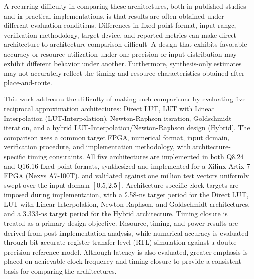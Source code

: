 \documentclass[manuscript,screen,review]{acmart}
\begin{document}
A recurring difficulty in comparing these architectures, both in published studies and in practical implementations, is that results are often obtained under different evaluation conditions. Differences in fixed-point format, input range, verification methodology, target device, and reported metrics can make direct architecture-to-architecture comparison difficult. A design that exhibits favorable accuracy or resource utilization under one precision or input distribution may exhibit different behavior under another. Furthermore, synthesis-only estimates may not accurately reflect the timing and resource characteristics obtained after place-and-route.

This work addresses the difficulty of making such comparisons by evaluating five reciprocal approximation architectures: Direct LUT, LUT with Linear Interpolation (LUT-Interpolation), Newton-Raphson iteration, Goldschmidt iteration, and a hybrid LUT-Interpolation/Newton-Raphson design (Hybrid). The comparison uses a common target FPGA, numerical format, input domain, verification procedure, and implementation methodology, with architecture-specific timing constraints. All five architectures are implemented in both Q8.24 and Q16.16 fixed-point formats, synthesized and implemented for a Xilinx Artix-7 FPGA (Nexys A7-100T), and validated against one million test vectors uniformly swept over the input domain $[0.5, 2.5]$. Architecture-specific clock targets are imposed during implementation, with a 2.58-ns target period for the Direct LUT, LUT with Linear Interpolation, Newton-Raphson, and Goldschmidt architectures, and a 3.333-ns target period for the Hybrid architecture. Timing closure is treated as a primary design objective. Resource, timing, and power results are derived from post-implementation analysis, while numerical accuracy is evaluated through bit-accurate register-transfer-level (RTL) simulation against a double-precision reference model. Although latency is also evaluated, greater emphasis is placed on achievable clock frequency and timing closure to provide a consistent basis for comparing the architectures.
\end{document}
